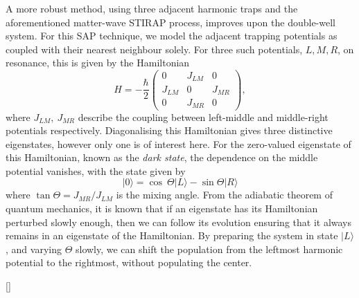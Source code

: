 A more robust method, using three adjacent harmonic traps and the aforementioned matter-wave STIRAP process, improves upon the double-well system. For this SAP technique, we model the adjacent trapping potentials as coupled with their nearest neighbour solely. For three such potentials, $L,M,R$, on resonance, this is given by the Hamiltonian
\begin{equation}\label{eqn:sap_ham}
    H = -\frac{\hbar}{2}
    \begin{pmatrix}
        0 & J_{LM} & 0 \\
        J_{LM} & 0 & J_{MR} \\
        0 & J_{MR} & 0
    \end{pmatrix},
\end{equation}
where $J_{LM},~J_{MR}$ describe the coupling between left-middle and middle-right potentials respectively. Diagonalising this Hamiltonian gives three distinctive eigenstates, however only one is of interest here. For the zero-valued eigenstate of this Hamiltonian, known as the \textit{dark state}, the dependence on the middle potential vanishes, with the state given by
\begin{equation}
 | 0 \rangle = \cos\ \Theta| L \rangle - \sin \Theta | R \rangle
\end{equation}
where $\tan \Theta=J_{MR}/J_{LM}$ is the mixing angle. From the adiabatic theorem of quantum mechanics, it is known that if an eigenstate has its Hamiltonian perturbed slowly enough, then we can follow its evolution ensuring that it always remains in an eigenstate of the Hamiltonian. By preparing the system in state $| L \rangle$, and varying $\Theta$ slowly, we can shift the population from the leftmost harmonic potential to the rightmost, without populating the center.

 []


